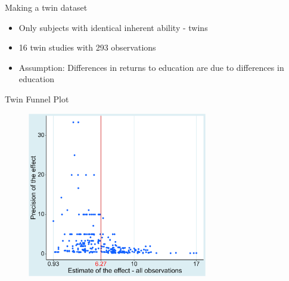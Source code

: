 \documentclass{beamer} %
\begin{document}
\begin{frame}{Making a twin dataset}

    \begin{itemize}
        \item Only subjects with identical inherent ability - twins
        \item 16 twin studies with 293 observations
        \item Assumption: Differences in returns to education are due to differences in education
    \end{itemize}

\end{frame}


\begin{frame}{Twin Funnel Plot}
    \begin{figure}[htbp]
        \begin{center}
            \includegraphics[width=0.7\textwidth]{Figures/funnel_twins.png}
        \end{center}
    \end{figure}
\end{frame}
\end{document}

